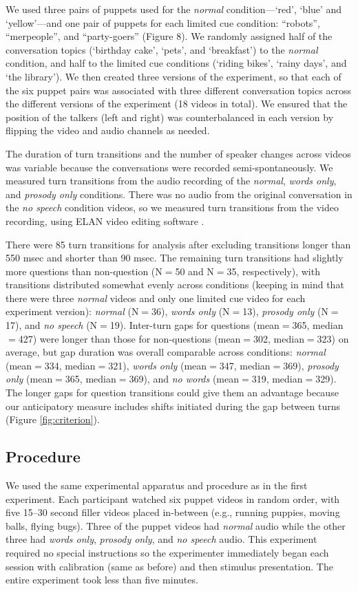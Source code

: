 \documentclass[authoryear, 12pt]{elsarticle}
\begin{document}
We used three pairs of puppets used for the \textit{normal} condition---`red', `blue' and `yellow'---and one pair of puppets for each limited cue condition: ``robots'', ``merpeople'', and ``party-goers'' (Figure 8). We randomly assigned half of the conversation topics (`birthday cake', `pets', and `breakfast') to the \textit{normal} condition, and half to the limited cue conditions (`riding bikes', `rainy days', and `the library'). We then created three versions of the experiment, so that each of the six puppet pairs was associated with three different conversation topics across the different versions of the experiment (18 videos in total). We ensured that the position of the talkers (left and right) was counterbalanced in each version by flipping the video and audio channels as needed.

The duration of turn transitions and the number of speaker changes across videos was variable because the conversations were recorded semi-spontaneously. We measured turn transitions from the audio recording of the \textit{normal}, \textit{words only}, and \textit{prosody only} conditions. There was no audio from the original conversation in the \textit{no speech} condition videos, so we measured turn transitions from the video recording, using ELAN video editing software \citep{ELAN}. 

There were 85 turn transitions for analysis after excluding transitions longer than 550 msec and shorter than 90 msec. The remaining turn transitions had slightly more questions than non-question (N$=$50 and N$=$35, respectively), with transitions distributed somewhat evenly across conditions (keeping in mind that there were three \textit{normal} videos and only one limited cue video for each experiment version): \textit{normal} (N$=$36), \textit{words only} (N$=$13), \textit{prosody only} (N$=$17), and \textit{no speech} (N$=$19). Inter-turn gaps for questions (mean$=$365, median$=$427) were longer than those for non-questions (mean$=$302, median$=$323) on average, but gap duration was overall comparable across conditions: \textit{normal} (mean$=$334, median$=$321), \textit{words only} (mean$=$347, median$=$369), \textit{prosody only} (mean$=$365, median$=$369), and \textit{no words} (mean$=$319, median$=$329). The longer gaps for question transitions could give them an advantage because our anticipatory measure includes shifts initiated during the gap between turns (Figure \ref{fig:criterion}).

\subsection{Procedure}
We used the same experimental apparatus and procedure as in the first experiment. Each participant watched six puppet videos in random order, with five 15--30 second filler videos placed in-between (e.g., running puppies, moving balls, flying bugs). Three of the puppet videos had \textit{normal} audio while the other three had \textit{words only}, \textit{prosody only}, and \textit{no speech} audio. This experiment required no special instructions so the experimenter immediately began each session with calibration (same as before) and then stimulus presentation. The entire experiment took less than five minutes.
\end{document}
